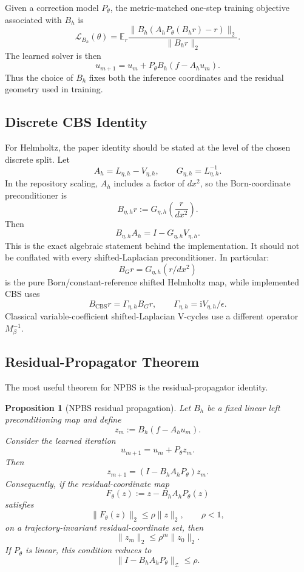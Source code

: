 \documentclass[11pt]{article}
\newtheorem{proposition}{Proposition}
\newcommand{\ii}{\mathrm{i}}
\begin{document}
Given a correction model \(P_\theta\), the metric-matched one-step training
objective associated with \(B_h\) is
\[
  \mathcal{L}_{B_h}(\theta)
  =
  \mathbb{E}_{r}
  \frac{\|B_h(A_hP_\theta(B_hr)-r)\|_2}{\|B_hr\|_2}.
\]
The learned solver is then
\[
  u_{m+1}=u_m+P_\theta B_h(f-A_hu_m).
\]
Thus the choice of \(B_h\) fixes both the inference coordinates and the residual
geometry used in training.

\subsection{Discrete CBS Identity}

For Helmholtz, the paper identity should be stated at the level of the chosen
discrete split. Let
\[
  A_h = L_{\eta,h} - V_{\eta,h}, \qquad G_{\eta,h} = L_{\eta,h}^{-1}.
\]
In the repository scaling, \(A_h\) includes a factor of \(dx^2\), so the
Born-coordinate preconditioner is
\[
  B_{\eta,h} r := G_{\eta,h}\left(\frac{r}{dx^2}\right).
\]
Then
\[
  B_{\eta,h} A_h
  =
  I - G_{\eta,h} V_{\eta,h}.
\]
This is the exact algebraic statement behind the implementation. It should not
be conflated with every shifted-Laplacian preconditioner. In particular:
\[
  B_G r = G_{\eta,h}(r/dx^2)
\]
is the pure Born/constant-reference shifted Helmholtz map, while implemented CBS
uses
\[
  B_{\mathrm{CBS}} r = \Gamma_{\eta,h} B_G r,
  \qquad
  \Gamma_{\eta,h} = \ii V_{\eta,h}/\epsilon .
\]
Classical variable-coefficient shifted-Laplacian V-cycles use a different
operator \(M_\beta^{-1}\).

\subsection{Residual-Propagator Theorem}

The most useful theorem for NPBS is the residual-propagator identity.

\begin{proposition}[NPBS residual propagation]
Let \(B_h\) be a fixed linear left preconditioning map and define
\[
  z_m := B_h(f-A_h u_m).
\]
Consider the learned iteration
\[
  u_{m+1} = u_m + P_\theta z_m .
\]
Then
\[
  z_{m+1}
  =
  (I - B_h A_h P_\theta) z_m .
\]
Consequently, if the residual-coordinate map
\[
  F_\theta(z):=z-B_hA_hP_\theta(z)
\]
satisfies
\[
  \|F_\theta(z)\|_2\le \rho\|z\|_2,\qquad \rho<1,
\]
on a trajectory-invariant residual-coordinate set, then
\[
  \|z_m\|_2 \le \rho^m \|z_0\|_2 .
\]
If \(P_\theta\) is linear, this condition reduces to
\[
  \|I-B_hA_hP_\theta\|_{\mathcal{Z}}\le \rho .
\]
\end{proposition}
\end{document}
